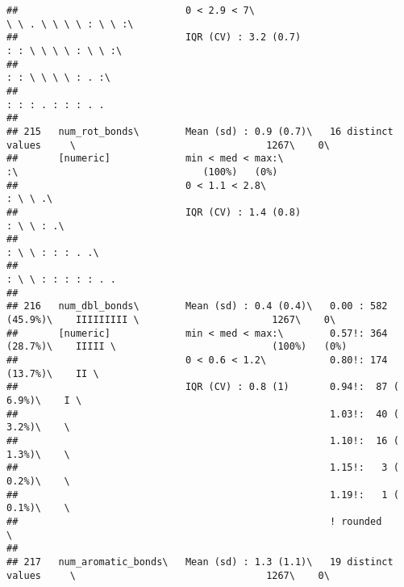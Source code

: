 \documentclass[]{article}
\begin{document}
\begin{verbatim}
##                             0 < 2.9 < 7\                                    \ \ . \ \ \ \ : \ \ :\                              
##                             IQR (CV) : 3.2 (0.7)                            : : \ \ \ \ : \ \ :\                                
##                                                                             : : \ \ \ \ : . :\                                  
##                                                                             : : : . : : : . .                                   
## 
## 215   num_rot_bonds\        Mean (sd) : 0.9 (0.7)\   16 distinct values     \                                 1267\    0\       
##       [numeric]             min < med < max:\                               :\                                (100%)   (0%)     
##                             0 < 1.1 < 2.8\                                  : \ \ .\                                            
##                             IQR (CV) : 1.4 (0.8)                            : \ \ : .\                                          
##                                                                             : \ \ : : : . .\                                    
##                                                                             : \ \ : : : : : . .                                 
## 
## 216   num_dbl_bonds\        Mean (sd) : 0.4 (0.4)\   0.00 : 582 (45.9%)\    IIIIIIIII \                       1267\    0\       
##       [numeric]             min < med < max:\        0.57!: 364 (28.7%)\    IIIII \                           (100%)   (0%)     
##                             0 < 0.6 < 1.2\           0.80!: 174 (13.7%)\    II \                                                
##                             IQR (CV) : 0.8 (1)       0.94!:  87 ( 6.9%)\    I \                                                 
##                                                      1.03!:  40 ( 3.2%)\    \                                                   
##                                                      1.10!:  16 ( 1.3%)\    \                                                   
##                                                      1.15!:   3 ( 0.2%)\    \                                                   
##                                                      1.19!:   1 ( 0.1%)\    \                                                   
##                                                      ! rounded              \                                                   
## 
## 217   num_aromatic_bonds\   Mean (sd) : 1.3 (1.1)\   19 distinct values     \                                 1267\    0\       

\end{verbatim}
\end{document}
